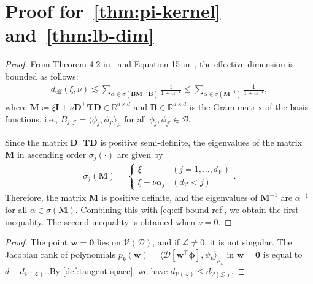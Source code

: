 \documentclass{article}
\def\mB{{\bm{B}}}
\def\mD{{\bm{D}}}
\def\mI{{\bm{I}}}
\def\mM{{\bm{M}}}
\def\mT{{\bm{T}}}
\def\emB{{B}}
\theoremstyle{plain}
\theoremstyle{definition}
\theoremstyle{remark}
\begin{document}
\section{Proof for~\cref{thm:pi-kernel} and~\cref{thm:lb-dim}}
\label{app:proof_thm:pi-kernel}
\eff*
\begin{proof}[Proof]
    From Theorem 4.2 in~\citep{doumeche2024physics} and Equation 15 in~\citep{doumeche2024physics2}, the effective dimension is bounded as follows:
    \begin{align}
        \label{eq:eff-bound-ref}
        d_{\mathrm{eff}}(\xi, \nu) \lesssim \sum_{\alpha \in \sigma(\mB\mM^{-1}\mB)} \frac{1}{1 + \alpha^{-1}} \leq \sum_{\alpha \in \sigma(\mM^{-1})} \frac{1}{1 + \alpha^{-1}},
    \end{align}
    where \(\mM \coloneqq \xi \mI + \nu \mD^{\top}\mT\mD \in \mathbb{R}^{d \times d}\) and \(\mB \in \mathbb{R}^{d \times d}\) is the Gram matrix of the basis functions, i.e., \(\emB_{j, j'} = \langle \phi_j, \phi_{j'} \rangle_{\mu} \) for all \(\phi_j, \phi_{j'} \in \mathcal{B}\).
    
    Since the matrix \(\mD^{\top}\mT\mD\) is positive semi-definite, the eigenvalues of the matrix \(\mM\) in ascending order \(\sigma_j(\cdot)\) are given by
    \begin{align*}
        \sigma_j(\mM) = \left\{\begin{array}{cc}
            \xi & (j = 1, \ldots, d_{\mathcal{V}}) \\
            \xi + \nu \alpha_j & (d_{\mathcal{V}} < j)
        \end{array} \right..
    \end{align*}
    Therefore, the matrix \(\mM\) is positive definite, and the eigenvalues of \(\mM^{-1}\) are \( \alpha^{-1} \) for all \(\alpha \in \sigma(\mM)\). Combining this with \cref{eq:eff-bound-ref}, we obtain the first inequality. The second inequality is obtained when \(\nu = 0\).
\end{proof}

\lowerbound*
\begin{proof}
The point \( \bm{w} =\bm{0} \) lies on \( \mathcal{V}(\mathscr{D}) \), and if \( \mathscr{L} \neq 0 \), it is not singular. The Jacobian rank of polynomials \( p_k(\bm{w}) = \langle \mathscr{D}[\bm{w}^{\top} \bm{\phi}], \psi_k \rangle_{\mu_k} \) in \( \bm{w} = \bm{0} \) is equal to \(d - d_{\mathcal{V}(\mathscr{L})}\). By \cref{def:tangent-space}, we have \(d_{\mathcal{V}(\mathscr{L})} \leq  d_{\mathcal{V}(\mathscr{D})}\).
\end{proof}
\end{document}

